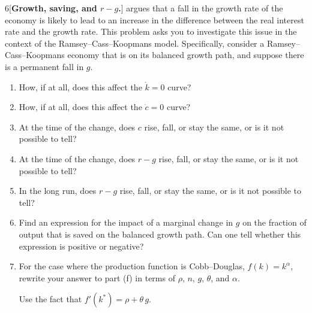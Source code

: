 \begin{problem}{6}[\textbf{Growth, saving, and \(r-g\).}]
\textcite{piketty2014capital} argues that a fall in the growth rate of the economy is likely to lead to an increase in the difference between the real interest rate and the growth rate. This problem asks you to investigate this issue in the context of the Ramsey--Cass--Koopmans model. Specifically, consider a Ramsey--Cass--Koopmans economy that is on its balanced growth path, and suppose there is a permanent fall in \(g\).
\begin{enumerate}[label=(\alph*)]
    \item How, if at all, does this affect the \(\dot{k}=0\) curve?
    \item How, if at all, does this affect the \(\dot{c}=0\) curve?
    \item At the time of the change, does \(c\) rise, fall, or stay the same, or is it not possible to tell?
    \item At the time of the change, does \(r-g\) rise, fall, or stay the same, or is it not possible to tell?
    \item In the long run, does \(r-g\) rise, fall, or stay the same, or is it not possible to tell?
    \item Find an expression for the impact of a marginal change in \(g\) on the fraction of output that is saved on the balanced growth path. Can one tell whether this expression is positive or negative?
    \item For the case where the production function is Cobb--Douglas, \(f\left(k\right)=k^{\alpha}\), rewrite your answer to part (f) in terms of \(\rho\), \(n\), \(g\), \(\theta\), and \(\alpha\). \par {} Use the fact that \(f'\left(k^*\right)=\rho+\theta\,g\).
\end{enumerate}
\end{problem}

